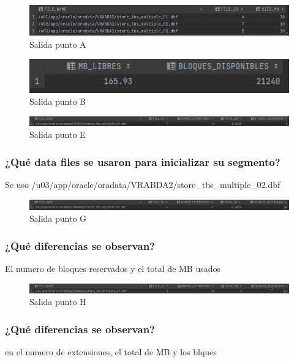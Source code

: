 \documentclass[journal]{IEEEtran}
\begin{document}
\begin{figure}[H]
  \centering
  \includegraphics[scale=.25]{captura_a.png}
   \caption{Salida punto A}
   \label{fig:validador_1}
\end{figure}
\begin{figure}[H]
  \centering
  \includegraphics[scale=.50]{captura_4.png}
   \caption{Salida punto B}
   \label{fig:validador_2}
\end{figure}
\begin{figure}[H]
  \centering
  \includegraphics[scale=.19]{captura_1.png}
   \caption{Salida punto E}
   \label{fig:validador_3}
\end{figure}
\subsubsection{¿Qué data files se usaron para inicializar su segmento?}
Se uso /u03/app/oracle/oradata/VRABDA2/store\_tbs\_multiple\_02.dbf
\begin{figure}[H]
  \centering
  \includegraphics[scale=.19]{captura_2.png}
   \caption{Salida punto G}
   \label{fig:validador_4}
\end{figure}
\subsubsection{¿Qué diferencias se observan?}
El numero de bloques reservados y el total de MB usados
\begin{figure}[H]
  \centering
  \includegraphics[scale=.19]{captura_3.png}
   \caption{Salida punto H}
   \label{fig:validador_5}
\end{figure}
\subsubsection{¿Qué diferencias se observan?} 
en el numero de extensiones, el total de MB y los blques
\end{document}
